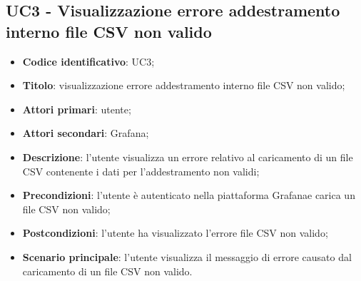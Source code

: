\subsection{UC3 - Visualizzazione errore addestramento interno file CSV non valido}
\begin{itemize}
	\item \textbf{Codice identificativo}: UC3;
	\item \textbf{Titolo}: visualizzazione errore addestramento interno file CSV non valido;
	\item \textbf{Attori primari}: utente;
	\item \textbf{Attori secondari}: Grafana\glo;
	\item \textbf{Descrizione}: l'utente visualizza un errore relativo al caricamento di un file CSV contenente i dati per l'addestramento non validi;
	\item \textbf{Precondizioni}: l'utente è autenticato nella piattaforma Grafana\glosp e carica un file CSV non valido;
	\item \textbf{Postcondizioni}: l'utente ha visualizzato l'errore file CSV non valido;	
	\item \textbf{Scenario principale}: l'utente visualizza il messaggio di errore causato dal caricamento di un file CSV non valido.	
\end{itemize}
